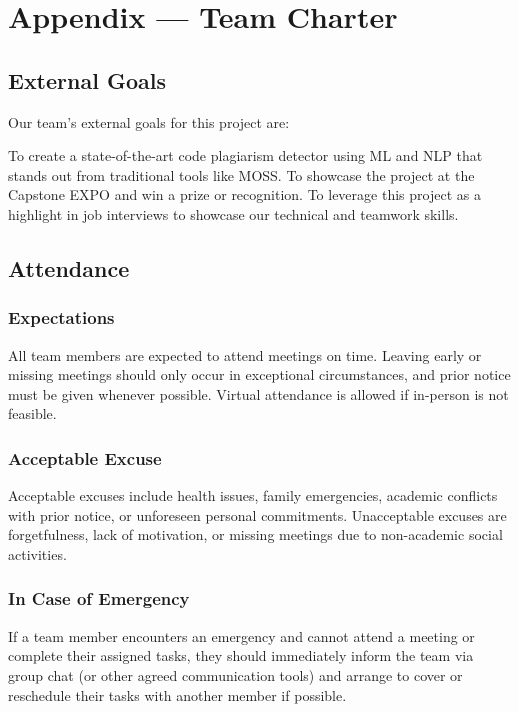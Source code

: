 \documentclass{article}
\begin{document}
\newpage{}

\section*{Appendix --- Team Charter}

\subsection*{External Goals}

Our team’s external goals for this project are:

To create a state-of-the-art code plagiarism detector using ML and NLP that stands out from traditional tools like MOSS.
To showcase the project at the Capstone EXPO and win a prize or recognition.
To leverage this project as a highlight in job interviews to showcase our technical and teamwork skills.
\subsection*{Attendance}

\subsubsection*{Expectations}

All team members are expected to attend meetings on time. Leaving early or missing meetings should only occur in exceptional circumstances, and prior notice must be given whenever possible. Virtual attendance is allowed if in-person is not feasible.

\subsubsection*{Acceptable Excuse}

Acceptable excuses include health issues, family emergencies, academic conflicts with prior notice, or unforeseen personal commitments. Unacceptable excuses are forgetfulness, lack of motivation, or missing meetings due to non-academic social activities.

\subsubsection*{In Case of Emergency}

If a team member encounters an emergency and cannot attend a meeting or complete their assigned tasks, they should immediately inform the team via group chat (or other agreed communication tools) and arrange to cover or reschedule their tasks with another member if possible.
\end{document}
